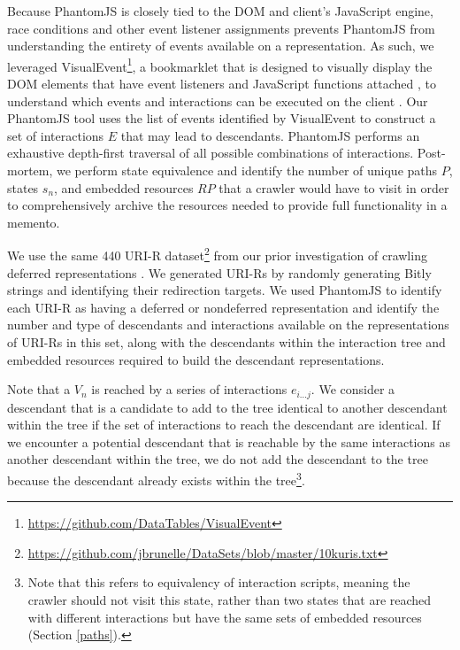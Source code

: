 \documentclass{sig-alternate}
\begin{document}
Because PhantomJS is closely tied to the DOM and client's JavaScript engine, race conditions and other event listener assignments prevents PhantomJS from understanding the entirety of events available on a representation. As such, we leveraged VisualEvent\footnote{\url{https://github.com/DataTables/VisualEvent}}, a bookmarklet that is designed to visually display the DOM elements that have event listeners and JavaScript functions attached \cite{seleniumpjs}, to understand which events and interactions can be executed on the client \cite{seleniumpjs}. 
Our PhantomJS tool uses the list of events identified by VisualEvent to construct a set of interactions $E$ that may lead to descendants. PhantomJS performs an exhaustive depth-first traversal of all possible combinations of interactions. Post-mortem, we perform state equivalence and identify the number of unique paths $P$, states $s_n$, and embedded resources $RP$ that a crawler would have to visit in order to comprehensively archive the resources needed to provide full functionality in a memento.

We use the same 440 URI-R dataset\footnote{\url{https://github.com/jbrunelle/DataSets/blob/master/10kuris.txt}} from our prior investigation of crawling deferred representations \cite{crawlingDeferred}. We generated URI-Rs by randomly generating Bitly strings and identifying their redirection targets. We used PhantomJS to identify each URI-R as having a deferred or nondeferred representation and identify the number and type of descendants and interactions available on the representations of URI-Rs in this set, along with the descendants within the interaction tree and embedded resources required to build the descendant representations. 

Note that a $V_n$ is reached by a series of interactions $e_{i...j}$. We consider a descendant that is a candidate to add to the tree identical to another descendant within the tree if the set of interactions to reach the descendant are identical. If we encounter a potential descendant that is reachable by the same interactions as another descendant within the tree, we do not add the descendant to the tree because the descendant already exists within the tree\footnote{Note that this refers to equivalency of interaction scripts, meaning the crawler should not visit this state, rather than two states that are reached with different interactions but have the same sets of embedded resources (Section \ref{paths}).}.
\end{document}
